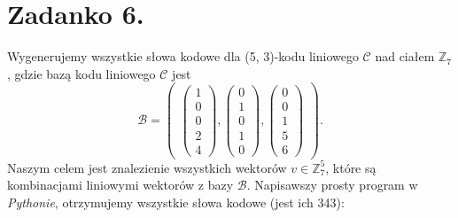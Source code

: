 \documentclass[10pt]{article} %
\begin{document}
\section*{Zadanko 6.}
Wygenerujemy wszystkie słowa kodowe dla (5, 3)-kodu liniowego $\mathcal{C}$ nad ciałem $\mathbb{Z}_7$, gdzie bazą kodu liniowego $\mathcal{C}$ jest  \vspace{10pt}
$$ \mathcal{B} = \begin{pmatrix} 
\begin{pmatrix} 1 \\0\\0\\2\\4 \end{pmatrix}, \begin{pmatrix} 0\\1\\0\\1\\0 \end{pmatrix}, \begin{pmatrix} 0\\0\\1\\5\\6 \end{pmatrix}
\end{pmatrix}.
$$ \vspace{10pt}
Naszym celem jest znalezienie wszystkich wektorów $v \in \mathbb{Z}_7^5$, które są kombinacjami liniowymi wektorów z bazy $\mathcal{B}$. Napisawszy prosty program w \textit{Pythonie}, otrzymujemy wszystkie słowa kodowe (jest ich 343): \\ \\
\end{document}
